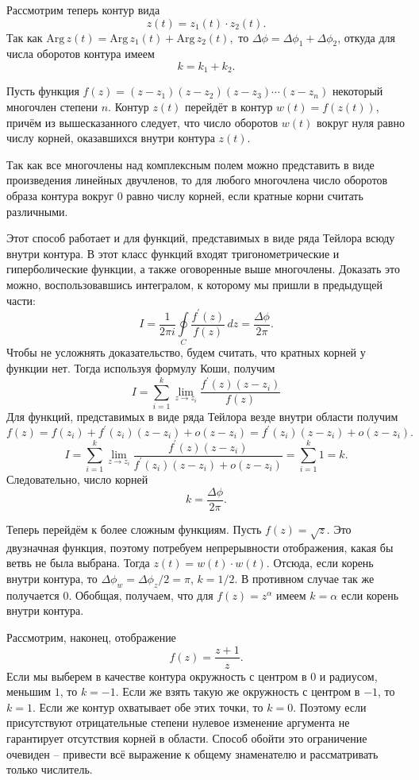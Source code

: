 \documentclass{ncc}
\begin{document}
Рассмотрим теперь контур вида
\[ z(t) = z_1(t)\cdot z_2(t). \]
Так как
\( \mathrm{Arg\,} z(t) = \mathrm{Arg\,} z_1(t) + \mathrm{Arg\,} z_2(t), \)
то \( \Delta \phi = \Delta \phi_1 + \Delta \phi_2 \), откуда для числа
оборотов контура имеем
\[ k = k_1 + k_2. \]

Пусть функция \( f(z) = (z-z_1)(z-z_2)(z-z_3)\cdots(z-z_n) \) некоторый
многочлен степени \( n \). Контур \(z(t)\) перейдёт в контур \(w(t) =
f(z(t))\), причём из вышесказанного следует, что число оборотов \( w(t) \)
вокруг нуля равно числу корней, оказавшихся внутри контура \( z(t) \).

Так как все многочлены над комплексным полем можно представить в виде
произведения линейных двучленов, то для любого многочлена число оборотов образа
контура вокруг \(0\) равно числу корней, если кратные корни считать различными.

Этот способ работает и для функций, представимых в виде ряда Тейлора всюду
внутри контура. В этот класс функций входят тригонометрические и гиперболические
функции, а также оговоренные выше многочлены. Доказать это можно, воспользовавшись интегралом, к которому мы пришли в предыдущей части:
\[
    I = \frac{1}{2\pi i}\oint\limits_{C} \frac{f^\prime(z)}{f(z)}\,dz = \frac{\Delta \phi}{2\pi}.
\]
Чтобы не усложнять доказательство, будем считать, что кратных корней у функции нет. Тогда используя формулу Коши, получим
\[
  I = \sum\limits_{i=1}^k \lim_{z\to z_i} \frac{f^\prime(z)(z-z_i)}{f(z)}
\]
Для функций, представимых в виде ряда Тейлора везде внутри области получим
\[
  f(z) = f(z_i) + f^\prime(z_i)(z-z_i) + o(z-z_i) = f^\prime(z_i)(z-z_i) + o(z-z_i).
\]
\[
  I = \sum\limits_{i=1}^k \lim_{z\to z_i} \frac{f^\prime(z)(z-z_i)}{f^\prime(z_i)(z-z_i)+o(z-z_i)}= \sum\limits_{i=1}^k 1 = k.
\]
Следовательно, число корней
\[
  k = \frac{\Delta\phi}{2\pi}.
\]

Теперь перейдём к более сложным функциям. Пусть \( f(z) = \sqrt{z} \). Это
двузначная функция, поэтому потребуем непрерывности отображения, какая бы ветвь
не была выбрана. Тогда \( z(t) = w(t)\cdot w(t) \). Отсюда, если корень внутри
контура, то \( \Delta\phi_w = \Delta\phi_z / 2 = \pi \), \( k = 1/2 \). В
противном случае так же получается \(0\). Обобщая, получаем, что для \( f(z) =
z^\alpha \) имеем \( k = \alpha \) если корень внутри контура.

Рассмотрим, наконец, отображение
\[
    f(z) = \frac{z+1}{z}.
\]
Если мы выберем в качестве контура окружность с центром в \(0\) и радиусом,
меньшим \(1\), то \(k = -1\). Если же взять такую же окружность с центром
в \(-1\), то \(k = 1\). Если же контур охватывает обе этих точки, то
\(k = 0\). Поэтому если присутствуют отрицательные степени нулевое изменение
аргумента не гарантирует отсутствия корней в области. Способ обойти это
ограничение очевиден -- привести всё выражение к общему знаменателю и
рассматривать только числитель.
\end{document}
